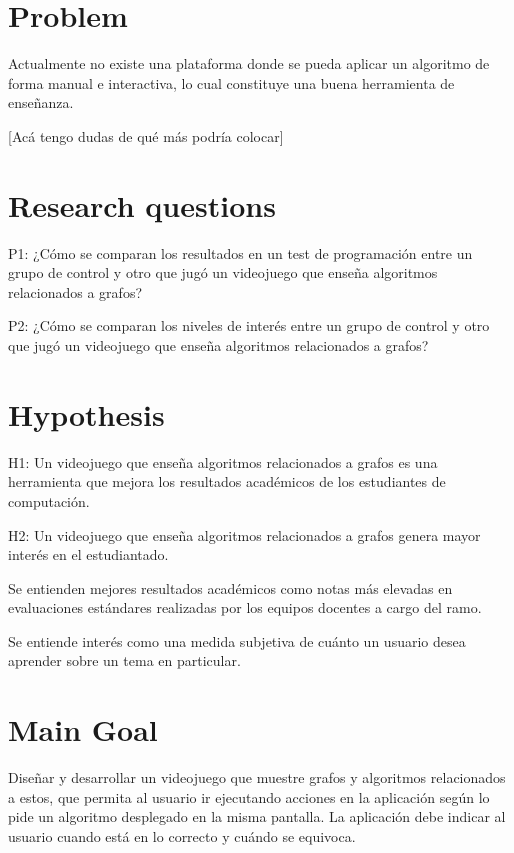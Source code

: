 \documentclass[submission]{eptcs}
\begin{document}
\section{Problem}

Actualmente no existe una plataforma donde se pueda aplicar
un algoritmo de forma manual e interactiva, lo cual constituye
una buena herramienta de enseñanza. 

[Acá tengo dudas de qué más podría colocar]




\section{Research questions}

P1: ¿Cómo se comparan los resultados en un test de programación entre un grupo de control y otro que
jugó un videojuego que enseña algoritmos relacionados a grafos?

P2: ¿Cómo se comparan los niveles de interés entre un grupo de control y otro que jugó un videojuego
que enseña algoritmos relacionados a grafos?


\section{Hypothesis}

H1: Un videojuego que enseña algoritmos relacionados a grafos es una herramienta
que mejora los resultados académicos de los estudiantes de computación.

H2: Un videojuego que enseña algoritmos relacionados a grafos genera mayor interés
en el estudiantado.

Se entienden mejores resultados académicos como notas más elevadas en evaluaciones estándares
realizadas por los equipos docentes a cargo del ramo.

Se entiende interés como una medida subjetiva de cuánto un usuario desea
aprender sobre un tema en particular. 

\section{Main Goal}

Diseñar y desarrollar un videojuego que muestre grafos y algoritmos relacionados a estos,
que permita al usuario ir ejecutando acciones en la aplicación según lo pide un algoritmo
desplegado en la misma pantalla. La aplicación debe indicar al usuario cuando está en lo
correcto y cuándo se equivoca.
\end{document}
